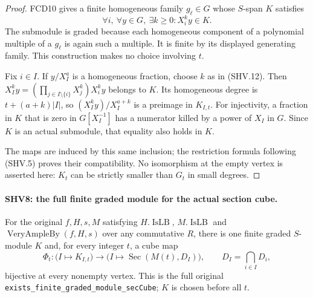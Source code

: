 \documentclass[11pt,a4paper]{article}
\numberwithin{equation}{section}
\theoremstyle{remark}\newtheorem{remark}[theorem]{Remark}
\begin{document}
\begin{proof}
FCD10 gives a finite homogeneous family $g_\ell\in G$ whose
$S$-span $K$ satisfies
\[
       \forall i,\ \forall y\in G,\ \exists k\ge0:
                         X_i^k y\in K.                 \tag{SHV.12}
\]
The submodule is graded because each homogeneous component of a
polynomial multiple of a $g_\ell$ is again such a multiple.
It is finite by its displayed generating family.  This construction
makes no choice involving $t$.

Fix $i\in I$.  If $y/X_I^a$ is a homogeneous fraction, choose
$k$ as in (SHV.12).  Then
$X_I^k y=(\prod_{j\in I\setminus\{i\}}X_j^k)X_i^k y$ belongs
to $K$.  Its homogeneous degree is $t+(a+k)|I|$, so
$(X_I^k y)/X_I^{a+k}$ is a preimage in $K_{I,t}$.
For injectivity, a fraction in $K$ that is zero in $G[X_I^{-1}]$
has a numerator killed by a power of $X_I$ in $G$.  Since $K$
is an actual submodule, that equality also holds in $K$.

The maps are induced by this same inclusion; the restriction
formula following (SHV.5) proves their compatibility.  No
isomorphism at the empty vertex is asserted here: $K_t$ can be
strictly smaller than $G_t$ in small degrees.
\end{proof}

\paragraph{SHV8: the full finite graded module for the actual section cube.}
\label{claim:SHV8}
For the original $f,H,s,M$ satisfying
$H.\operatorname{IsLB}$, $M.\operatorname{IsLB}$ and
$\operatorname{VeryAmpleBy}(f,H,s)$ over any commutative $R$,
there is one finite graded $S$-module $K$ and, for every integer
$t$, a cube map
\[
 \Phi_t:\bigl(I\longmapsto K_{I,t}\bigr)
       \longrightarrow
       \bigl(I\longmapsto\operatorname{Sec}(M(t),D_I)\bigr),
 \qquad D_I=\bigcap_{i\in I}D_i,
                                                        \tag{SHV.13}
\]
bijective at every nonempty vertex.  This is the full original
\texttt{exists\_\allowbreak finite\_\allowbreak graded\_\allowbreak module\_\allowbreak sec\allowbreak Cube};
$K$ is chosen before all $t$.
\end{document}
